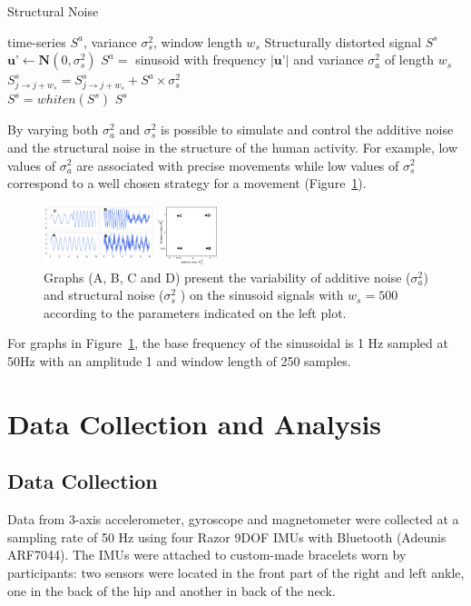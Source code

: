 \documentclass[10pt,journal,compsoc]{IEEEtran}
\begin{document}
\begin{algorithm}[H]
\caption{Structural Noise}
\begin{algorithmic}[1]
 \renewcommand{\algorithmicrequire}{\textbf{Input:}}
 \renewcommand{\algorithmicensure}{\textbf{Output:}}
 \REQUIRE time-series $S^a$, variance $\sigma_s ^2$, window length $w_s$
 \ENSURE  Structurally distorted signal $S^s$
  \STATE $\textbf{u'} \leftarrow \textbf{N}(0, \sigma_s ^2)$
  \STATE $S^{a} =$ sinusoid with frequency $| \textbf{u'} |$ and variance $\sigma_a ^2$ of length $w_s$
  \STATE $S^s_{j \rightarrow j+w_s}  = S^s_{j \rightarrow j+w_s}  + S^{a} \times   \sigma_s ^2 $
  \ENDFOR
  \\ $S^s= whiten (S^s)$
 \RETURN $S^s$
\end{algorithmic}
\end{algorithm}


By varying both $\sigma_a ^2$ and $\sigma_s ^2$ is possible to simulate and
control the additive noise and the structural noise in the structure of the
human activity. For example, low values of $\sigma_a ^2$ are associated with
precise movements while low values of $\sigma_s ^2$ correspond to a well chosen
strategy for a movement (Figure~\ref{fig:sn}).

\begin{figure}[!htb]
\centering \includegraphics[width=0.45\textwidth]{impactofnoise01}
\caption[PA]{Graphs (A, B, C and D) present the variability of additive noise
  ($\sigma_a ^2$) and structural noise ($\sigma_s ^2$ ) on the sinusoid signals
  with $w_s=500$ according to the parameters indicated on the left plot.}
\label{fig:sn}
\end{figure}

For graphs in Figure~\ref{fig:sn}, the base frequency of the sinusoidal is 1 Hz
sampled at 50Hz with an amplitude 1 and window length of 250 samples.


\section{Data Collection and Analysis}

\subsection{Data Collection}
Data from 3-axis accelerometer, gyroscope and magnetometer 
were collected at a sampling rate of 50 Hz using four Razor 
9DOF IMUs with Bluetooth (Adeunis ARF7044). The IMUs were 
attached to custom-made bracelets worn by participants: 
two sensors were located in the front part of the right 
and left ankle, one in the back of the hip and 
another in back of the neck.
\end{document}
